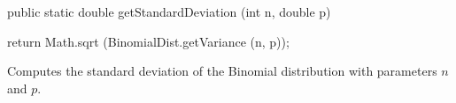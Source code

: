 \begin{htmlonly}
\end{htmlonly}
\begin{code}

   public static double getStandardDeviation (int n, double p)\begin{hide} {
      return Math.sqrt (BinomialDist.getVariance (n, p));
   }\end{hide}
\end{code}
\begin{tabb}  Computes the standard deviation of the Binomial distribution with
   parameters $n$ and $p$.
\end{tabb}
\begin{htmlonly}
\end{htmlonly}
